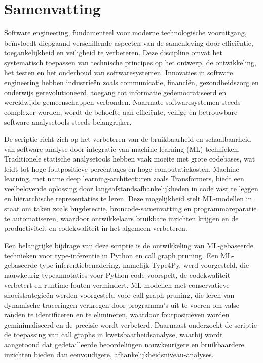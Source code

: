 \chapter*{Samenvatting}

{
Software engineering, fundamenteel voor moderne technologische vooruitgang, beïnvloedt diepgaand verschillende aspecten van de samenleving door efficiëntie, toegankelijkheid en veiligheid te verbeteren. Deze discipline omvat het systematisch toepassen van technische principes op het ontwerp, de ontwikkeling, het testen en het onderhoud van softwaresystemen. Innovaties in software engineering hebben industrieën zoals communicatie, financiën, gezondheidszorg en onderwijs gerevolutioneerd, toegang tot informatie gedemocratiseerd en wereldwijde gemeenschappen verbonden. Naarmate softwaresystemen steeds complexer worden, wordt de behoefte aan efficiënte, veilige en betrouwbare software-analysetools steeds belangrijker.

De scriptie richt zich op het verbeteren van de bruikbaarheid en schaalbaarheid van software-analyse door integratie van machine learning (ML) technieken. Traditionele statische analysetools hebben vaak moeite met grote codebases, wat leidt tot hoge foutpositieve percentages en hoge computatiekosten. Machine learning, met name deep learning-architecturen zoals Transformers, biedt een veelbelovende oplossing door langeafstandsafhankelijkheden in code vast te leggen en hiërarchische representaties te leren. Deze mogelijkheid stelt ML-modellen in staat om taken zoals bugdetectie, broncode-samenvatting en programmareparatie te automatiseren, waardoor ontwikkelaars bruikbare inzichten krijgen en de productiviteit en codekwaliteit in het algemeen verbeteren.

Een belangrijke bijdrage van deze scriptie is de ontwikkeling van ML-gebaseerde technieken voor type-inferentie in Python en call graph pruning. Een ML-gebaseerde type-inferentiebenadering, namelijk Type4Py, werd voorgesteld, die nauwkeurig typeannotaties voor Python-code voorspelt, de codekwaliteit verbetert en runtime-fouten vermindert. ML-modellen met conservatieve snoeistrategieën werden voorgesteld voor call graph pruning, die leren van dynamische traceringen verkregen door programma's uit te voeren om valse randen te identificeren en te elimineren, waardoor foutpositieven worden geminimaliseerd en de precisie wordt verbeterd. Daarnaast onderzoekt de scriptie de toepassing van call graphs in kwetsbaarheidsanalyse, waarbij wordt aangetoond dat gedetailleerde beoordelingen nauwkeurigere en bruikbaardere inzichten bieden dan eenvoudigere, afhankelijkheidsniveau-analyses.

}
